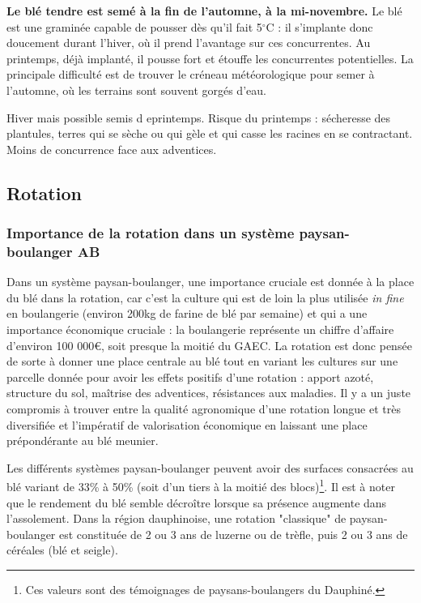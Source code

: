 \documentclass{article}
\begin{document}
\textbf{Le blé tendre est semé à la fin de l'automne, à la mi-novembre.} Le blé est une graminée capable de pousser dès qu'il fait 5$^\circ$C : il s'implante donc doucement durant l'hiver, où il prend l'avantage sur ces concurrentes. Au printemps, déjà implanté, il pousse fort et étouffe les concurrentes potentielles. La principale difficulté est de trouver le créneau météorologique pour semer à l'automne, où les terrains sont souvent gorgés d'eau. 

Hiver mais possible semis d eprintemps. Risque du printemps : sécheresse des plantules, terres qui se sèche ou qui gèle et qui casse les racines en se contractant. Moins de concurrence face aux adventices.

\subsection{Rotation}

\subsubsection{Importance de la rotation dans un système paysan-boulanger AB}

Dans un système paysan-boulanger, une importance cruciale est donnée à la place du blé dans la rotation, car c'est la culture qui est de loin la plus utilisée \textit{in fine} en boulangerie (environ 200kg de farine de blé par semaine) et qui a une importance économique cruciale : la boulangerie représente un chiffre d'affaire d'environ 100 000\euro{}, soit presque la moitié du GAEC. La rotation est donc pensée de sorte à donner une place centrale au blé tout en variant les cultures sur une parcelle donnée pour avoir les effets positifs d'une rotation : apport azoté, structure du sol, maîtrise des adventices, résistances aux maladies. Il y a un juste compromis à trouver entre la qualité agronomique d'une rotation longue et très diversifiée et l'impératif de valorisation économique en laissant une place prépondérante au blé meunier.

 Les différents systèmes paysan-boulanger peuvent avoir des surfaces consacrées au blé variant de 33\% à 50\% (soit d'un tiers à la moitié des blocs)\footnote{Ces valeurs sont des témoignages de paysans-boulangers du Dauphiné.}. Il est à noter que le rendement du blé semble décroître lorsque sa présence augmente dans l'assolement. Dans la région dauphinoise, une rotation "classique" de paysan-boulanger est constituée de 2 ou 3 ans de luzerne ou de trèfle, puis 2 ou 3 ans de céréales (blé et seigle). 
\end{document}

